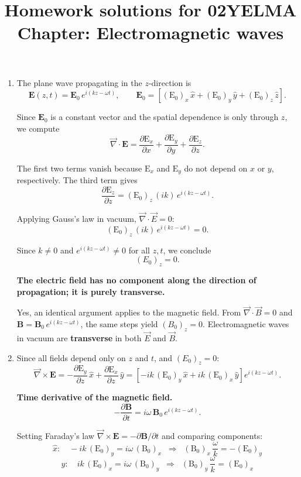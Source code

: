 \documentclass[12pt]{article}
\title{Homework solutions for 02YELMA \\ Chapter: Electromagnetic waves}
\newcommand{\tvec}[1]{\mathbf{#1}}
\newcommand{\tsc}[1]{\mathrm{#1}}
\begin{document}
\date{}
\maketitle
\vspace{-0.8in}

\begin{enumerate}

\item The plane wave propagating in the $z$-direction is
\[
\tvec{E}(z,t) = \tvec{E}_0\, e^{i(kz - \omega t)}, \qquad
\tvec{E}_0 = \left[(\tsc{E}_0)_x\,\hat{x} + (\tsc{E}_0)_y\,\hat{y} + (\tsc{E}_0)_z\,\hat{z}\right].
\]

Since $\tvec{E}_0$ is a constant vector and the spatial dependence is only through $z$, we compute
\[
\vec{\nabla}\cdot\tvec{E}
= \frac{\partial \tsc{E}_x}{\partial x}
+ \frac{\partial \tsc{E}_y}{\partial y}
+ \frac{\partial \tsc{E}_z}{\partial z}.
\]

The first two terms vanish because $\tsc{E}_x$ and $\tsc{E}_y$ do not depend on $x$ or $y$, respectively. The third term gives
\[
\frac{\partial \tsc{E}_z}{\partial z}
= (\tsc{E}_0)_z\,(ik)\,e^{i(kz-\omega t)}.
\]

Applying Gauss's law in vacuum, $\vec{\nabla}\cdot\vec{E}=0$:
\[
(\tsc{E}_0)_z\,(ik)\,e^{i(kz-\omega t)} = 0.
\]

Since $k \neq 0$ and $e^{i(kz-\omega t)} \neq 0$ for all $z,t$, we conclude
\[
\boxed{(E_0)_z = 0.}
\]

\textbf{The electric field has no component along the direction of propagation; it is purely transverse.}

Yes, an identical argument applies to the magnetic field. From $\vec{\nabla}\cdot\vec{B}=0$ and $\tvec{B}=\tvec{B}_0\,e^{i(kz-\omega t)}$, the same steps yield $(B_0)_z=0$. Electromagnetic waves in vacuum are \textbf{transverse} in both $\vec{E}$ and $\vec{B}$.



\item Since all fields depend only on $z$ and $t$, and $(E_0)_z = 0$:
\[
\vec{\nabla}\times\tvec{E}
= -\frac{\partial \tsc{E}_y}{\partial z}\,\hat{x}
+ \frac{\partial \tsc{E}_x}{\partial z}\,\hat{y}
= \left[-ik\,(\tsc{E}_0)_y\,\hat{x}
+ ik\,(\tsc{E}_0)_x\,\hat{y}\right]e^{i(kz-\omega t)}.
\]

\textbf{Time derivative of the magnetic field.}
\[
-\frac{\partial \tvec{B}}{\partial t}
= i\omega\,\tvec{B}_0\,e^{i(kz-\omega t)}.
\]

Setting Faraday's law $\vec{\nabla}\times\tvec{E} = -\partial\tvec{B}/\partial t$ and comparing components:
\[
\hat{x}:\quad -ik\,(\tsc{E}_0)_y = i\omega\,(\tsc{B}_0)_x
\;\;\Longrightarrow\;\;
\boxed{(\tsc{B}_0)_x\,\frac{\omega}{k} = -(\tsc{E}_0)_y}
\]
\[
\hat{y}:\quad ik\,(\tsc{E}_0)_x = i\omega\,(\tsc{B}_0)_y
\;\;\Longrightarrow\;\;
\boxed{(\tsc{B}_0)_y\,\frac{\omega}{k} = (\tsc{E}_0)_x}
\]


\end{enumerate}
\end{document}
